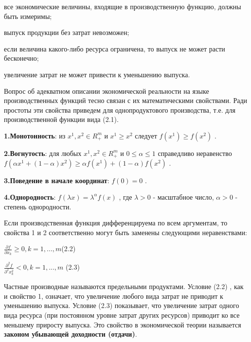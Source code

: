 \documentclass[12pt, 4paper]{book}
\begin{document}
{все экономические величины, входящие в производственную функцию, должны быть измеримы; 
\par

выпуск продукции без затрат невозможен; 
\par

если величина какого-либо ресурса ограничена, то выпуск не может расти бесконечно; 
\par

увеличение затрат не может привести к уменьшению выпуска.
\par

Вопрос об адекватном описании экономической реальности на языке производственных функций тесно связан с их математическими свойствами. Ради простоты эти свойства приведем для однопродуктового производства, т.е. для производственной функции вида (2.1).
\par

\textbf{1.Монотонность}: из $x^1,x^2 \in R_{+}^{m}$ и $x^1 \geq x^2$ следует $f(x^1) \geq f(x^2)$ . 
\par

\textbf{2.Вогнутость}: для любых $x^1,x^2 \in R_{+}^{m}$ и $ 0 \leq \alpha \leq 1$ справедливо неравенство $f(\alpha x^1 +(1-\alpha)x^2) \geq \alpha f(x^1)+ (1- \alpha)f(x^2)$  . 
\par

\textbf{3.Поведение в начале координат}: $f(0)=0$ . 
\par

\textbf{4.Однородность}: $f(\lambda x)=\lambda^{\alpha} f(x)$ , где $\lambda > 0$ - масштабное число, $\alpha >0 $ - степень однородности.
\par

Если производственная функция дифференцируема по всем аргументам, то свойства 1 и 2 соответственно могут быть заменены следующими неравенствами: 
\begin{center}
$\frac{\partial f }{\partial x_k} \geq 0, k=1,...,m$(2.2)
\end{center}
\begin{center}
$\frac{\partial^2 f}{\partial^2 x_{k}^{2}}< 0 , k=1,...,m$ (2.3)
\end{center}
\par

Частные производные  называются предельными продуктами. Условие (2.2) , как и свойство 1, означает, что увеличение любого вида затрат не приводит к уменьшению выпуска. Условие (2.3) показывает, что увеличение затрат одного вида ресурса (при постоянном уровне затрат других ресурсов) приводит ко все меньшему приросту выпуска. Это свойство в экономической теории называется \textbf{законом убывающей доходности (отдачи)}. 
\par

}
\end{document}
